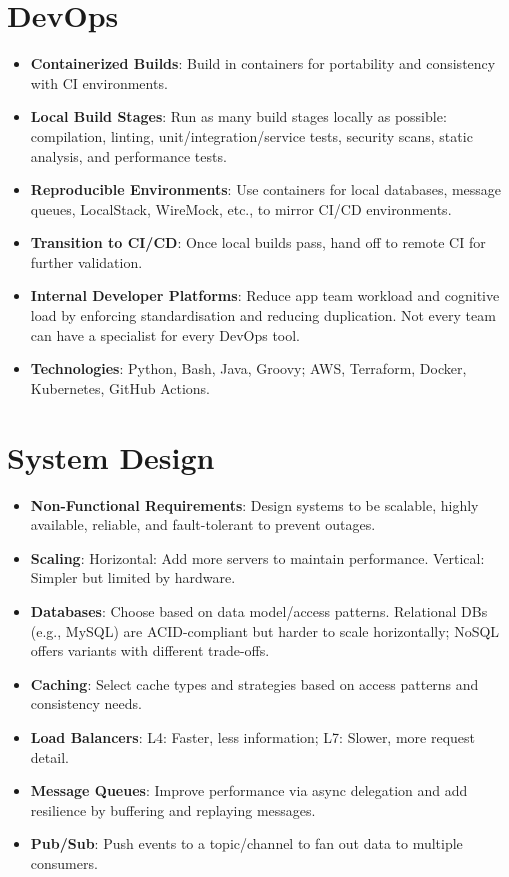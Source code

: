 \documentclass[letterpaper,11pt]{article}
\newcommand{\resumeItem}[2]{
  \item\small{
    \textbf{#1}{: #2 \vspace{-2pt}}
  }
}
\newcommand{\resumeSubHeadingListStart}{\begin{itemize}[leftmargin=*]}
\newcommand{\resumeSubHeadingListEnd}{\end{itemize}}
\begin{document}
\section{DevOps}
  \resumeSubHeadingListStart
    \resumeItem{Containerized Builds}
      {Build in containers for portability and consistency with CI environments.}
    \resumeItem{Local Build Stages}
      {Run as many build stages locally as possible: compilation, linting, unit/integration/service tests, security scans, static analysis, and performance tests.}
    \resumeItem{Reproducible Environments}
      {Use containers for local databases, message queues, LocalStack, WireMock, etc., to mirror CI/CD environments.}
    \resumeItem{Transition to CI/CD}
      {Once local builds pass, hand off to remote CI for further validation.}
    \resumeItem{Internal Developer Platforms}
      {Reduce app team workload and cognitive load by enforcing standardisation and reducing duplication. Not every team can have a specialist for every DevOps tool.}
    \resumeItem{Technologies}
      {Python, Bash, Java, Groovy; AWS, Terraform, Docker, Kubernetes, GitHub Actions.}
  \resumeSubHeadingListEnd

\section{System Design}
  \resumeSubHeadingListStart
    \resumeItem{Non-Functional Requirements}
      {Design systems to be scalable, highly available, reliable, and fault-tolerant to prevent outages.}
    \resumeItem{Scaling}
      {Horizontal: Add more servers to maintain performance. Vertical: Simpler but limited by hardware.}
    \resumeItem{Databases}
      {Choose based on data model/access patterns. Relational DBs (e.g., MySQL) are ACID-compliant but harder to scale horizontally; NoSQL offers variants with different trade-offs.}
    \resumeItem{Caching}
      {Select cache types and strategies based on access patterns and consistency needs.}
    \resumeItem{Load Balancers}
      {L4: Faster, less information; L7: Slower, more request detail.}
    \resumeItem{Message Queues}
      {Improve performance via async delegation and add resilience by buffering and replaying messages.}
    \resumeItem{Pub/Sub}
      {Push events to a topic/channel to fan out data to multiple consumers.}
  \resumeSubHeadingListEnd
\end{document}
